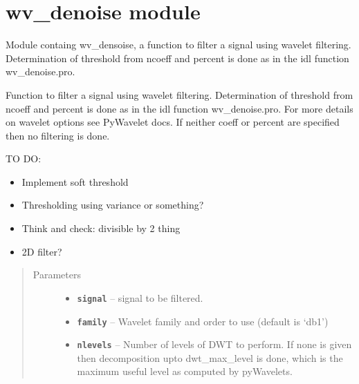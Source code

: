\documentclass[letterpaper,10pt,english]{sphinxmanual}
\begin{document}
\section{wv\_denoise module}
\label{wv_denoise:wv-denoise-module}\label{wv_denoise:module-wv_denoise}\label{wv_denoise::doc}
Module containg wv\_densoise, a function to filter a signal using wavelet filtering.
Determination of threshold from ncoeff and percent is
done as in the idl function wv\_denoise.pro.

\begin{fulllineitems}
\label{wv_denoise:wv_denoise.wv_denoise}
Function to filter a signal using wavelet filtering.
Determination of threshold from ncoeff and percent is
done as in the idl function wv\_denoise.pro.
For more details on wavelet options see PyWavelet docs.
If neither coeff or percent are specified then no filtering is
done.

TO DO:
\begin{itemize}
\item {} 
Implement soft threshold

\item {} 
Thresholding using variance or something?

\item {} 
Think and check: divisible by 2 thing

\item {} 
2D filter?

\end{itemize}
\begin{quote}\begin{description}
\item[{Parameters}] \leavevmode\begin{itemize}
\item {} 
\textbf{\texttt{signal}} -- signal to be filtered.

\item {} 
\textbf{\texttt{family}} -- Wavelet family and order to use (default is `db1')

\item {} 
\textbf{\texttt{nlevels}} -- Number of levels of DWT to perform. If none is given then
decomposition upto dwt\_max\_level is done, which
is the maximum useful level as computed by pyWavelets.


\end{itemize}
\end{description}
\end{quote}
\end{fulllineitems}
\end{document}
